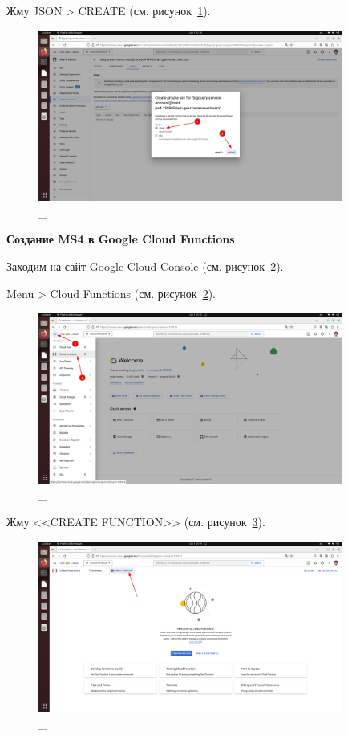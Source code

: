 \documentclass[12pt, a4paper, simple]{eskdtext}
\begin{document}
  Жму JSON > CREATE (см. рисунок~\ref{fig:24}).

  \begin{figure}[!h]
    \centering
    \includegraphics[width=10cm]
    {images/GoogleCloudBigQuery/2023-03-01_22-18-46.png}
    \caption{\_}
    \label{fig:24}
  \end{figure}

  \newpage
  \begin{center}
    \textbf{Создание MS4 в Google Cloud Functions}
  \end{center}

  Заходим на сайт Google Cloud Console \cite{GoogleCloudConsole} (см. рисунок~\ref{fig:25}).

  Menu > Cloud Functions \cite{GoogleCloudFunctions} (см. рисунок~\ref{fig:25}).

  \begin{figure}[!h]
    \centering
    \includegraphics[width=10cm]
    {images/GoogleCloudFunctions/2023-03-01_05-43-48.png}
    \caption{\_}
    \label{fig:25}
  \end{figure}

  Жму <<CREATE FUNCTION>> (см. рисунок~\ref{fig:26}).

  \begin{figure}[!h]
    \centering
    \includegraphics[width=10cm]
    {images/GoogleCloudFunctions/2023-03-01_05-44-11.png}
    \caption{\_}
    \label{fig:26}
  \end{figure}
\end{document}
